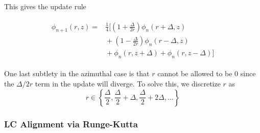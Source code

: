 \documentclass[twocolumn,aps,prl]{revtex4-1} %
\begin{document}
This gives the update rule

\begin{align*}
\begin{split}
   \phi_{n+1}(r,z) ={}& \frac{1}{4} \bigg[ \left(1 + \frac{\Delta}{2r}\right)\phi_n(r+\Delta,z) \\
   &{} + \left( 1 - \frac{\Delta}{2r}\right)\phi_n(r-\Delta,z) \\
         &  {} + \phi_n(r,z+\Delta) + \phi_n(r,z-\Delta) \bigg]
\end{split}
\end{align*}

One last subtlety in the azimuthal case is that $r$ cannot be allowed to be 0 since the $\Delta / 2r$ term in the update will diverge.  To solve this, we discretize $r$ as $$r \in \left\{\frac{\Delta}{2}, \frac{\Delta}{2} + \Delta, \frac{\Delta}{2} + 2 \Delta, \dots \right\}$$

\subsubsection{LC Alignment via Runge-Kutta}
\end{document}
